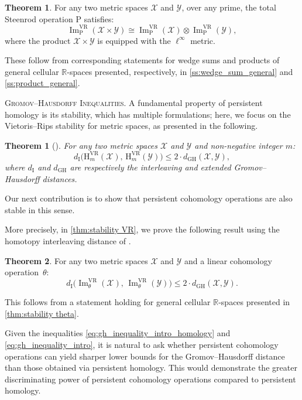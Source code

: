 \documentclass{amsart}
\newtheorem*{theorem*}{Theorem}
\theoremstyle{definition}
\newcommand{\ot}{\otimes}
\newcommand{\rH}{\mathrm{H}}
\newcommand{\rP}{\mathrm{P}}
\newcommand{\cX}{\mathcal{X}}
\newcommand{\cY}{\mathcal{Y}}
\newcommand{\VR}{\mathrm{VR}}
\theoremstyle{theorem}
\newtheorem{introtheorem}{Theorem}
\DeclareMathOperator{\img}{Im}
\newcommand{\dgh}{d_{\mathrm{GH}}}
\newcommand{\di}{d_{\mathrm{I}}}
\begin{document}
\begin{introtheorem}\label{thm:decomposition2}
	For any two metric spaces $\cX$ and $\cY$, over any prime, the total Steenrod operation \(\rP\) satisfies:
	\[
	\img^{\VR}_\rP(\cX \times \cY) \cong \img^{\VR}_\rP(\cX) \ot \img^{\VR}_\rP(\cY),
	\]
	where the product \(\cX \times \cY\) is equipped with the \(\ell^\infty\) metric.
\end{introtheorem}

These follow from corresponding statements for wedge sums and products of general cellular $\mathbb{R}$-spaces presented, respectively, in \cref{ss:wedge_sum_general} and \cref{ss:product_general}.

\medskip\noindent\textsc{Gromov--Hausdorff Inequalities.}
A fundamental property of persistent homology is its stability, which has multiple formulations; here, we focus on the Vietoris--Rips stability for metric spaces, as presented in the following.
\begin{theorem*}[\cite{chazal2009gromov, chazal2014geometric}]
	\label{thm:stability ph}
	For any two metric spaces $\cX$ and $\cY$ and non-negative integer $m$:
	\begin{equation}\label{eq:gh_inequality_intro_homology}
		\di\big(\rH_m^\VR(\cX),\, \rH_m^\VR(\cY)\big) \leq 2 \cdot \dgh(\cX,\cY),
	\end{equation}
	where \(\di\) and \(\dgh\) are respectively the interleaving and extended Gromov--Hausdorff distances.
\end{theorem*}

Our next contribution is to show that persistent cohomology operations are also stable in this sense.

More precisely, in \cref{thm:stability VR}, we prove the following result using the homotopy interleaving distance of \cite{blumberg2023interleaving}.

\begin{introtheorem}\label{thm:stability intro}
	For any two metric spaces $\cX$ and $\cY$ and a linear cohomology operation~$\theta$:
	\begin{equation}\label{eq:gh_inequality_intro}
		\di\big(\img_\theta^\VR(\cX),\, \img_\theta^\VR(\cY)\big) \leq 2 \cdot \dgh(\cX,\cY).
	\end{equation}
\end{introtheorem}

This follows from a statement holding for general cellular $\mathbb{R}$-spaces presented in \cref{thm:stability theta}.

\medskip Given the inequalities \eqref{eq:gh_inequality_intro_homology} and \eqref{eq:gh_inequality_intro},
it is natural to ask whether persistent cohomology operations can yield sharper lower bounds for the Gromov--Hausdorff distance than those obtained via persistent homology.
This would demonstrate the greater discriminating power of persistent cohomology operations compared to persistent homology.
\end{document}
